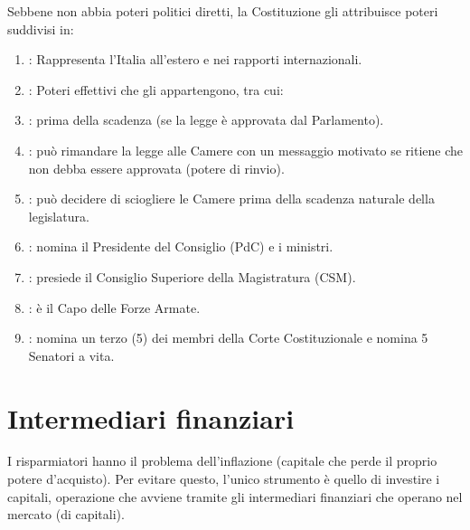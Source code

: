 \documentclass[letterpaper,10pt,italian]{sphinxmanual}
\begin{document}
\sphinxAtStartPar
Sebbene non abbia poteri politici diretti, la Costituzione gli attribuisce poteri suddivisi in:
\begin{enumerate}
%
\item {} 
\sphinxAtStartPar
{}: Rappresenta l’Italia all’estero e nei rapporti internazionali.

\item {} 
\sphinxAtStartPar
{}: Poteri effettivi che gli appartengono, tra cui:

\item {} 
\sphinxAtStartPar
{}: prima della scadenza (se la legge è approvata dal Parlamento).

\item {} 
\sphinxAtStartPar
{}: può rimandare la legge alle Camere con un messaggio motivato se ritiene che non debba essere approvata (potere di rinvio).

\item {} 
\sphinxAtStartPar
{}: può decidere di sciogliere le Camere prima della scadenza naturale della legislatura.

\item {} 
\sphinxAtStartPar
{}: nomina il Presidente del Consiglio (PdC) e i ministri.

\item {} 
\sphinxAtStartPar
{}: presiede il Consiglio Superiore della Magistratura (CSM).

\item {} 
\sphinxAtStartPar
{}: è il Capo delle Forze Armate.

\item {} 
\sphinxAtStartPar
{}: nomina un terzo (5) dei membri della Corte Costituzionale e nomina 5 Senatori a vita.

\end{enumerate}

\sphinxstepscope


\chapter{Intermediari finanziari}
\label{\detokenize{Intermediari finanziari:intermediari-finanziari}}\label{\detokenize{Intermediari finanziari::doc}}
\sphinxAtStartPar
I risparmiatori hanno il problema dell’inflazione (capitale che perde il proprio potere d’acquisto).
Per evitare questo, l’unico strumento è quello di investire i capitali, operazione che avviene tramite gli intermediari finanziari che operano nel mercato (di capitali).
\end{document}
